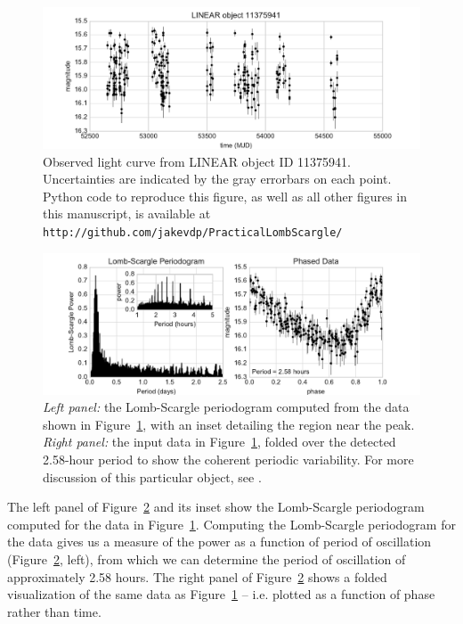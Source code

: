 \documentclass[preprint]{aastex}
\newcommand{\fig}[1]{Figure~\ref{fig:#1}}
\newcommand{\figlabel}[1]{\label{fig:#1}}
\begin{document}
\begin{figure}[ht]
\centering
\includegraphics[width=\textwidth]{fig01_LINEAR_data}
\caption{Observed light curve from LINEAR object ID 11375941. Uncertainties
  are indicated by the gray errorbars on each point.
  Python code to reproduce this figure, as well as all other figures
  in this manuscript, is available at {\tt http://github.com/jakevdp/PracticalLombScargle/}
  \figlabel{LINEAR-data}
}
\end{figure}


\begin{figure}[ht]
\centering
\includegraphics[width=\textwidth]{fig02_LINEAR_PSD}
\caption{{\it Left panel:} the Lomb-Scargle periodogram computed from the data
    shown in \fig{LINEAR-data}, with an inset detailing the region near the peak.
    {\it Right panel:} the input data in \fig{LINEAR-data}, folded over the
    detected 2.58-hour period to show the coherent periodic variability.
    For more discussion of this particular object, see \citep{LINEAR3}.
    \figlabel{LINEAR-power}
}
\end{figure}

The left panel of \fig{LINEAR-power} and its inset show the Lomb-Scargle
periodogram computed for the data in \fig{LINEAR-data}.
Computing the Lomb-Scargle periodogram for the data gives us a measure of the
power as a function of period of oscillation (\fig{LINEAR-power}, left), from
which we can determine the period of oscillation of approximately 2.58 hours.
The right panel of \fig{LINEAR-power} shows a folded visualization of
the same data as \fig{LINEAR-data} -- i.e.{} plotted as a function of phase
rather than time.
\end{document}
